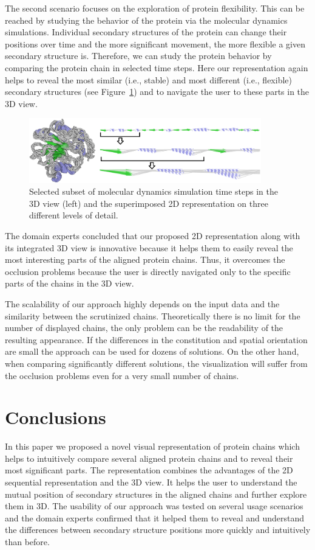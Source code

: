 \documentclass[twocolumn]{bmcart}%
\begin{document}
The second scenario focuses on the exploration of protein flexibility.
This can be reached by studying the behavior of the protein via the molecular dynamics simulations.
Individual secondary structures of the protein can change their positions over time and the more significant movement, the more flexible a given secondary structure is.
Therefore, we can study the protein behavior by comparing the protein chain in selected time steps.
Here our representation again helps to reveal the most similar (i.e., stable) and most different (i.e., flexible) secondary structures (see Figure~\ref{fig:case2}) and to navigate the user to these parts in the 3D view.

\begin{figure}[hbt]
  \centering
  \includegraphics[width=0.9\textwidth]{pics/case2.png}
  \caption{Selected subset of molecular dynamics simulation time steps in the 3D view (left) and the superimposed 2D representation on three different levels of detail.}
  \label{fig:case2}
\end{figure}

The domain experts concluded that our proposed 2D representation along with its integrated 3D view is innovative because it helps them to easily reveal the most interesting parts of the aligned protein chains.
Thus, it overcomes the occlusion problems because the user is directly navigated only to the specific parts of the chains in the 3D view.

The scalability of our approach highly depends on the input data and the similarity between the scrutinized chains.
Theoretically there is no limit for the number of displayed chains, the only problem can be the readability of the resulting appearance.
If the differences in the constitution and spatial orientation are small the approach can be used for dozens of solutions.
On the other hand, when comparing significantly different solutions, the visualization will suffer from the occlusion problems even for a very small number of chains.

\section*{Conclusions}
In this paper we proposed a novel visual representation of protein chains which helps to intuitively compare several aligned protein chains and to reveal their most significant parts.
The representation combines the advantages of the 2D sequential representation and the 3D view. 
It helps the user to understand the mutual position of secondary structures in the aligned chains and further explore them in 3D.
The usability of our approach was tested on several usage scenarios and the domain experts confirmed that it helped them to reveal and understand the differences between secondary structure positions more quickly and intuitively than before.
\end{document}
